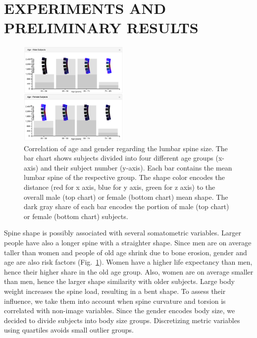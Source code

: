 \documentclass[a4paper,twoside]{style/article}
\begin{document}
\section{\uppercase{Experiments and Preliminary Results}}
\label{sec:Experiments}
\begin{figure}[!h]
  \centering
  \includegraphics[width=0.475\textwidth]{figures/age-gender}
  \caption{
	Correlation of age and gender regarding the lumbar spine size.
	The bar chart shows subjects divided into four different age groups (x-axis) and their subject number (y-axis).
	Each bar contains the mean lumbar spine of the respective group.
	The shape color encodes the distance (red for x axis, blue for y axis, green for z axis) to the overall male (top chart) or female (bottom chart) mean shape.
	The dark gray share of each bar encodes the portion of male (top chart) or female (bottom chart) subjects.
	}
  \label{fig:age-gender}
\end{figure}
\noindent Spine shape is possibly associated with several somatometric variables.
Larger people have also a longer spine with a straighter shape.
Since men are on average taller than women and people of old age shrink due to bone erosion, gender and age are also risk factors (Fig.~\ref{fig:age-gender}).
Women have a higher life expectancy than men, hence their higher share in the old age group.
Also, women are on average smaller than men, hence the larger shape similarity with older subjects.
Large body weight increases the spine load, resulting in a bent shape.
To assess their influence, we take them into account when spine curvature and torsion is correlated with non-image variables.
Since the gender encodes body size, we decided to divide subjects into body size groups.
Discretizing metric variables using quartiles avoids small outlier groups.
\end{document}
